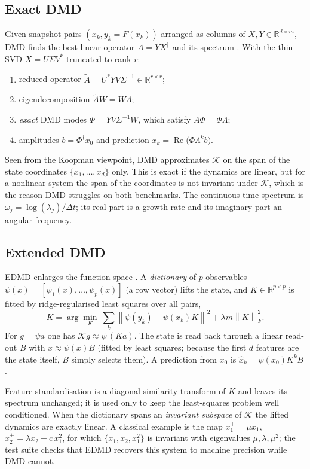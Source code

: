 \documentclass[11pt,a4paper]{article}
\newcommand{\R}{\mathbb{R}}
\newcommand{\Kop}{\mathcal{K}}
\newcommand{\norm}[1]{\left\lVert #1\right\rVert}
\begin{document}
\subsection{Exact DMD}
Given snapshot pairs $(x_k,y_k=F(x_k))$ arranged as columns of $X,Y\in\R^{d\times m}$, DMD finds the
best linear operator $A=YX^{\dagger}$ and its spectrum \cite{Schmid2010,Tu2014}. With the thin SVD
$X=U\Sigma V^{*}$ truncated to rank $r$:
\begin{enumerate}
  \item reduced operator $\tilde A=U^{*}YV\Sigma^{-1}\in\R^{r\times r}$;
  \item eigendecomposition $\tilde A W=W\Lambda$;
  \item \emph{exact} DMD modes $\Phi=YV\Sigma^{-1}W$, which satisfy $A\Phi=\Phi\Lambda$;
  \item amplitudes $b=\Phi^{\dagger}x_0$ and prediction $x_k=\operatorname{Re}\bigl(\Phi\Lambda^{k}b\bigr)$.
\end{enumerate}
Seen from the Koopman viewpoint, DMD approximates $\Kop$ on the span of the state coordinates
$\{x_1,\dots,x_d\}$ only. This is exact if the dynamics are linear, but for a nonlinear system the span of
the coordinates is not invariant under $\Kop$, which is the reason DMD struggles on both benchmarks.
The continuous-time spectrum is $\omega_j=\log(\lambda_j)/\Delta t$; its real part is a growth rate and its
imaginary part an angular frequency.

\subsection{Extended DMD}
EDMD enlarges the function space \cite{Williams2015}. A \emph{dictionary} of $p$ observables
$\psi(x)=[\psi_1(x),\dots,\psi_p(x)]$ (a row vector) lifts the state, and $K\in\R^{p\times p}$ is fitted
by ridge-regularised least squares over all pairs,
\begin{equation}
  K=\arg\min_{K}\ \sum_{k}\norm{\psi(y_k)-\psi(x_k)K}^2+\lambda m\norm{K}_F^2 .
\end{equation}
For $g=\psi a$ one has $\Kop g\approx\psi\,(Ka)$. The state is read back through a linear read-out
$B$ with $x\approx\psi(x)B$ (fitted by least squares; because the first $d$ features are the state itself,
$B$ simply selects them). A prediction from $x_0$ is $\hat x_k=\psi(x_0)K^{k}B$.

Feature standardisation is a diagonal similarity transform of $K$ and leaves its spectrum unchanged; it is used
only to keep the least-squares problem well conditioned. When the dictionary spans an \emph{invariant
subspace} of $\Kop$ the lifted dynamics are exactly linear. A classical example is the map
$x_1^+=\mu x_1$, $x_2^+=\lambda x_2+c\,x_1^2$, for which $\{x_1,x_2,x_1^2\}$ is invariant with eigenvalues
$\mu,\lambda,\mu^2$; the test suite checks that EDMD recovers this system to machine precision while DMD cannot.
\end{document}
